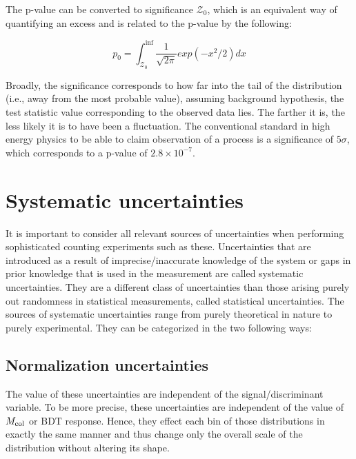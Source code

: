 The p-value can be converted to significance $\mathcal{Z}_0$, which is an equivalent way of quantifying an excess and is related to the p-value by the following:

\begin{equation}                                                                                                                          
  \label{eq:sig}                                                                                                                           p_0=\int_{\mathcal{Z}_0}^{\inf}\frac{1}{\sqrt{2\pi}}exp(-x^2/2)dx
\end{equation}

Broadly, the significance corresponds to how far into the tail of the distribution (i.e., away from the most probable value), assuming background hypothesis, the test statistic value corresponding to the observed data lies. The farther it is, the less likely it is to have been a fluctuation. The conventional standard in high energy physics to be able to claim observation of a process is a significance of $5\sigma$, which corresponds to a p-value of $2.8\times 10^{-7}$.


\section{Systematic uncertainties}
\label{exp_uncert}
It is important to consider all relevant sources of uncertainties when performing sophisticated counting experiments such as these. Uncertainties that are introduced as a result of imprecise/inaccurate knowledge of the system or gaps in prior knowledge that is used in the measurement are called systematic uncertainties. They are a different class of uncertainties than those arising purely out randomness in statistical measurements, called statistical uncertainties. The sources of systematic uncertainties range from purely theoretical in nature to purely experimental. They can be categorized in the two following ways:
\subsection{Normalization uncertainties}
The value of these uncertainties are independent of the signal/discriminant variable. To be more precise, these uncertainties are independent of the value of $M_{\text{col}}$ or BDT response. Hence, they effect each bin of those distributions in exactly the same manner and thus change only the overall scale of the distribution without altering its shape.

